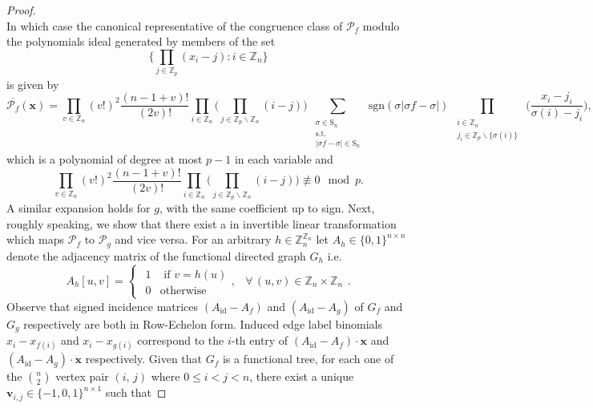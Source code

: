 \begin{proof}
\[\]
In which case the canonical representative of the congruence class of $\mathcal{P}_f$ modulo the polynomials ideal generated by members of the set
\[
\bigg\{\prod_{j\in\mathbb{Z}_{p}}(x_{i}-j):i\in\mathbb{Z}_{n}\bigg\}
\]
is given by
\begin{equation} \label{eq:new-graceful-evaluation}
\overline{\mathcal{P}_{f}}(\mathbf{x})=\prod_{v\in\mathbb{Z}_{n}}(v!)^{2}\frac{(n-1+v)!}{(2v)!}\prod_{i\in\mathbb{Z}_{n}}\big(\prod_{j\in\mathbb{Z}_{p}\backslash\mathbb{Z}_{n}}(i-j)\big)\sum_{\begin{array}{c}
\substack{\sigma\in\text{S}_{n}\\
\text{s.t.}\\
\left|\sigma f-\sigma\right|\in\text{S}_{n}
}
\end{array}}\text{sgn}(\sigma\left|\sigma f-\sigma\right|)\prod_{\begin{array}{c}
\substack{i\in\mathbb{Z}_{n}\\
j_{i}\in\mathbb{Z}_{p}\backslash\{\sigma(i)\}
}
\end{array}}\big(\frac{x_{i}-j_{i}}{\sigma(i)-j_{i}}\big),
\end{equation}
which is a polynomial of degree at most $p-1$ in each variable and
\[
\prod_{v\in\mathbb{Z}_{n}}(v!)^{2}\frac{(n-1+v)!}{(2v)!}\prod_{i\in\mathbb{Z}_{n}}\big(\prod_{j\in\mathbb{Z}_{p}\backslash\mathbb{Z}_{n}}(i-j)\big)\not\equiv0\mod p.
\]
A similar expansion holds for $g$, with the same coefficient up to sign. Next, roughly speaking, we show that there exist a in invertible linear transformation which  maps $\mathcal{P}_f$ to $\mathcal{P}_g$ and vice versa. For an arbitrary $h\in \mathbb{Z}_{n}^{\mathbb{Z}_{n}}$ let $A_{h}\in\{0,1\}^{n\times n}$ denote the adjacency matrix of the functional directed graph $G_h$ i.e.
\[
A_{h}[u,v]=\begin{cases}
\begin{array}{cc}
1 & \text{ if }v=h(u)\\
0 & \text{otherwise}
\end{array}, & \forall\,(u,v)\in\mathbb{Z}_{n}\times\mathbb{Z}_{n}\end{cases}.
\]
Observe that signed incidence matrices $(A_{\text{id}}-A_{f})$ and $(A_{\text{id}}-A_{g})$ of $G_f$ and $G_g$ respectively are both in Row-Echelon form. Induced edge label binomials $x_i-x_{f(i)}$ and $x_i-x_{g(i)}$ correspond to the $i$-th entry of $(A_{\text{id}}-A_{f})\cdot \mathbf{x}$ and $(A_{\text{id}}-A_{g})\cdot \mathbf{x}$ respectively. Given that $G_f$ is a functional tree, for each one of the ${n \choose 2}$ vertex pair $(i,\,j)$ where $0\le i < j <n$, there exist a unique $\mathbf{v}_{i,j}\in\{-1,0,1\}^{n\times1}$ such that

\end{proof}
